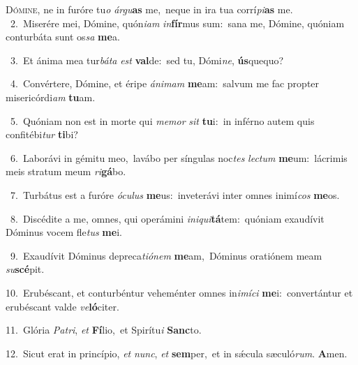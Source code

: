 \lettrine{\initial\textcolor{\initialcolor}{D}}{ómine,} ne in furóre tu\textit{o} \textit{ár}\-\textit{gu}\textbf{as} me,~\star neque in ira tua corrí\-\textit{pi}\-\textbf{as} me.\\
{\numbfont\textcolor{\numbcolor}{~2.}}~Miserére mei, Dómine, quón\-\textit{i}\-\textit{am} \textit{in}\-\textbf{fír}mus sum:~\star sana me, Dómine, quóniam conturbáta sunt os\textit{sa} \textbf{me}\-a.\par
{\numbfont\textcolor{\numbcolor}{~3.}}~Et ánima mea tur\-\textit{bá}\-\textit{ta} \textit{est} \textbf{val}\-de:~\star sed tu, Dómi\-\textit{ne}\-, \textbf{ús}\-quequo?\par
{\numbfont\textcolor{\numbcolor}{~4.}}~Convértere, Dómine, et éripe \textit{á}\-\textit{ni}\textit{mam} \textbf{me}\-am:~\star salvum me fac propter misericórdi\textit{am} \textbf{tu}\-am.\par
{\numbfont\textcolor{\numbcolor}{~5.}}~Quóniam non est in morte qui \textit{me}\-\textit{mor} \textit{sit} \textbf{tu}\-i:~\star in inférno autem quis confitébi\textit{tur} \textbf{ti}\-bi?\par
{\numbfont\textcolor{\numbcolor}{~6.}}~Laborávi in gémitu meo,~\dagger lavábo per síngulas noc\textit{tes} \textit{lec}\-\textit{tum} \textbf{me}\-um:~\star lácrimis meis stratum meum \textit{ri}\-\textbf{gá}bo.\par
{\numbfont\textcolor{\numbcolor}{~7.}}~Turbátus est a furóre \textit{ó}\-\textit{cu}\textit{lus} \textbf{me}\-us:~\star inveterávi inter omnes inimí\textit{cos} \textbf{me}\-os.\par
{\numbfont\textcolor{\numbcolor}{~8.}}~Discédite a me, omnes, qui operámini \textit{in}\-\textit{i}\textit{qui}\textbf{tá}tem:~\star quóniam exaudívit Dóminus vocem fle\textit{tus} \textbf{me}\-i.\par
{\numbfont\textcolor{\numbcolor}{~9.}}~Exaudívit Dóminus depreca\-\textit{ti}\-\textit{ó}\textit{nem} \textbf{me}\-am,~\star Dóminus oratiónem meam \textit{su}\-\textbf{scé}pit.\par
{\numbfont\textcolor{\numbcolor}{10.}}~Erubéscant, et conturbéntur veheménter omnes in\-\textit{i}\-\textit{mí}\textit{ci} \textbf{me}\-i:~\star convertántur et erubéscant valde \textit{ve}\-\textbf{ló}citer.\par
{\numbfont\textcolor{\numbcolor}{11.}}~Glória \textit{Pa}\-\textit{tri}, \textit{et} \textbf{Fí}\-lio,~\star et Spirítu\textit{i} \textbf{Sanc}\-to.\par
{\numbfont\textcolor{\numbcolor}{12.}}~Sicut erat in princípio, \textit{et} \textit{nunc}\-, \textit{et} \textbf{sem}\-per,~\star et in sǽcula sæculó\-\textit{rum}\-. \textbf{A}\-men.\par
